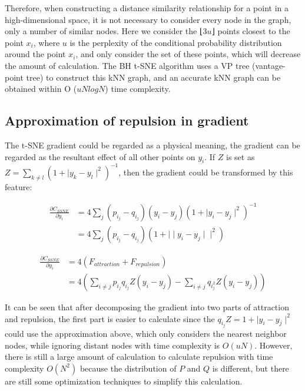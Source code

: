 \noindent Therefore, when constructing a distance similarity relationship for a point in a high-dimensional space, it is not necessary to consider every node in the graph, only a number of similar nodes. Here we consider the ⌊3$u$⌋ points closest to the point $x_i$, where $u$ is the perplexity of the conditional probability distribution around the point $x_i$, and only consider the set of these points, which will decrease the amount of calculation. The BH t-SNE algorithm uses a VP tree (vantage-point tree) to construct this kNN graph, and an accurate kNN graph can be obtained within O ($uNlogN$) time complexity.\\

\subsection{Approximation of repulsion in gradient}

The t-SNE gradient could be regarded as a physical meaning, the gradient can be regarded as the resultant effect of all other points on $y_i$. If $Z$ is set as $Z = \sum_{k \neq l} (1+ \mid y_k−y_l \mid ^2)^{-1}$, then the gradient could be transformed by this feature:

\begin{equation*}
\begin{aligned}
\frac{\partial C_{SSNE}}{\partial y_i} &= {4\sum_j(p_i_j - q_i_j)(y_i - y_j)(1 + \mid y_i - y_j \mid ^ 2) ^{-1}}\\
&= {4\sum_j(p_i_j - q_i_j) (1 + \mid \mid y_i - y_j \mid \mid ^ 2)}
\end{aligned}
\end{equation*}

\begin{equation*}
\begin{aligned}
\frac{\partial C_{SSNE}}{\partial y_i} &= {4(F_{attraction} + F_{repulsion})}\\
&= 4({\sum_{i \neq j}p_i_j q_i_j Z (y_i - y_j)} - {\sum_{i \neq j}q_i_j^2 Z (y_i - y_j)}) 
\end{aligned}
\end{equation*}

\noindent It can be seen that after decomposing the gradient into two parts of attraction and repulsion, the first part is easier to calculate since the $q_i_j Z = 1 + \mid y_i - y_j \mid ^ 2 $ could use the approximation above, which only considers the nearest neighbor nodes, while ignoring distant nodes with time complexity is $O(uN)$. However, there is still a large amount of calculation to calculate repulsion with time complexity $O(N^2)$ because the distribution of $P$ and $Q$ is different, but there are still some optimization techniques to simplify this calculation.\\

